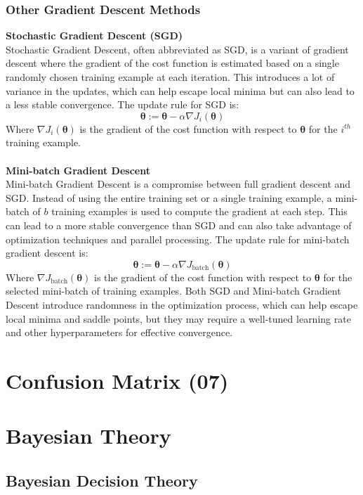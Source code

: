 \documentclass{article}
\begin{document}
\subsubsection{Other Gradient Descent Methods}
\textbf{Stochastic Gradient Descent (SGD)}\\
Stochastic Gradient Descent, often abbreviated as SGD, is a variant of gradient descent where the gradient of the cost function is estimated based on a single randomly chosen training example at each iteration. This introduces a lot of variance in the updates, which can help escape local minima but can also lead to a less stable convergence. The update rule for SGD is:
\[
\mathbf{\theta} := \mathbf{\theta} - \alpha \nabla J_i(\mathbf{\theta})
\]
Where \( \nabla J_i(\mathbf{\theta}) \) is the gradient of the cost function with respect to \( \mathbf{\theta} \) for the \(i^{th}\) training example.\\
  \\
\textbf{Mini-batch Gradient Descent}\\
Mini-batch Gradient Descent is a compromise between full gradient descent and SGD. Instead of using the entire training set or a single training example, a mini-batch of \( b \) training examples is used to compute the gradient at each step. This can lead to a more stable convergence than SGD and can also take advantage of optimization techniques and parallel processing. The update rule for mini-batch gradient descent is:
\[
\mathbf{\theta} := \mathbf{\theta} - \alpha \nabla J_{\text{batch}}(\mathbf{\theta})
\]
Where \( \nabla J_{\text{batch}}(\mathbf{\theta}) \) is the gradient of the cost function with respect to \( \mathbf{\theta} \) for the selected mini-batch of training examples. Both SGD and Mini-batch Gradient Descent introduce randomness in the optimization process, which can help escape local minima and saddle points, but they may require a well-tuned learning rate and other hyperparameters for effective convergence.
\newpage

\section{Confusion Matrix (07)}
\newpage

\section{Bayesian Theory}
\subsection{Bayesian Decision Theory}
\end{document}
